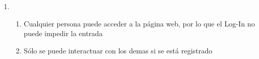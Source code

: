\documentclass[12pt, letterpaper, notitlepage]{article}
\begin{document}
\begin{enumerate}
	\item {}
		\begin{enumerate}
			\item Cualquier persona puede acceder a la página web, por lo que el Log-In no puede impedir la entrada
			\item Sólo se puede interactuar con los demas si se está registrado
		\end{enumerate}				
		
	
		
	
\end{enumerate}
\end{document}
